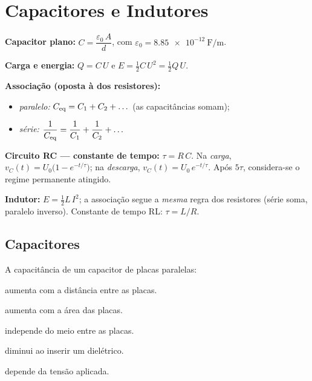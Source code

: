 \section{Capacitores e Indutores}

\begin{conceito}
\textbf{Capacitor plano:} $C = \dfrac{\varepsilon_0\,A}{d}$, com
$\varepsilon_0 = \SI{8.85e-12}{\farad\per\meter}$.\par
\textbf{Carga e energia:} $Q = C\,U$ \quad e \quad
$E = \tfrac12 C\,U^2 = \tfrac12 Q\,U$.\par
\textbf{Associação (oposta à dos resistores):}
\begin{itemize}[leftmargin=1.6em,itemsep=1pt,topsep=2pt]
\item \emph{paralelo:} $C_{\mathrm{eq}} = C_1 + C_2 + \dots$ (as capacitâncias somam);
\item \emph{série:} $\dfrac{1}{C_{\mathrm{eq}}} = \dfrac{1}{C_1}+\dfrac{1}{C_2}+\dots$
\end{itemize}
\textbf{Circuito RC --- constante de tempo:} $\tau = R\,C$. Na \emph{carga},
$v_C(t) = U_0\big(1-e^{-t/\tau}\big)$; na \emph{descarga},
$v_C(t) = U_0\,e^{-t/\tau}$. Após $5\tau$, considera-se o regime permanente
atingido.\par
\textbf{Indutor:} $E = \tfrac12 L\,I^2$; a associação segue a \emph{mesma} regra
dos resistores (série soma, paralelo inverso). Constante de tempo RL:
$\tau = L/R$.
\end{conceito}

\legendaniveis

\subsection{Capacitores}

\blocofixacao

\begin{questao}[1]{}
A capacitância de um capacitor de placas paralelas:
\begin{alternativas}
\item aumenta com a distância entre as placas.
\item aumenta com a área das placas.
\item independe do meio entre as placas.
\item diminui ao inserir um dielétrico.
\item depende da tensão aplicada.
\end{alternativas}
\end{questao}

